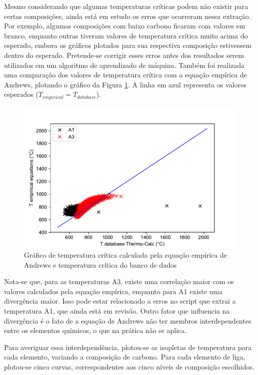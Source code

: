 \documentclass[brazil,tese,epusp]{usp}
\begin{document}
Mesmo considerando que algumas temperaturas críticas podem não existir para certas composições, ainda está em estudo os erros que ocorreram nessa extração. Por exemplo, algumas composições com baixo carbono ficaram com valores em branco, enquanto outras tiveram valores de temperatura crítica muito acima do esperado, embora os gráficos plotados para sua respectiva composição estivessem dentro do esperado. Pretende-se corrigir esses erros antes dos resultados serem utilizados em um algoritmo de aprendizado de máquina.
Também foi realizada uma comparação dos valores de temperatura crítica com a equação empírica de Andrews, plotando o gráfico da Figura \ref{fig:tcrit_andrews}. A linha em azul representa os valores esperados ($T_{empirical} = T_{database}$).

\begin{figure}
  \includegraphics[width=1.1\textwidth]{img/andrews.pdf}
  \caption{Gráfico de temperatura crítica calculada pela equação empírica de Andrews e temperatura crítica do banco de dados}
  \label{fig:tcrit_andrews}
\end{figure}

Nota-se que, para as temperaturas A3, existe uma correlação maior com os valores calculados pela equação empírica, enquanto para A1 existe uma divergência maior. Isso pode estar relacionado a erros no script que extrai a temperatura A1, que ainda está em revisão. Outro fator que influencia na divergência é o fato de a equação de Andrews não ter membros interdependentes entre os elementos químicos, o que na prática não se aplica.

Para averiguar essa interdependência, plotou-se as isopletas de temperatura para cada elemento, variando a composição de carbono. Para cada elemento de liga, plotou-se cinco curvas, correspondentes aos cinco níveis de composição escolhidos.
\end{document}
